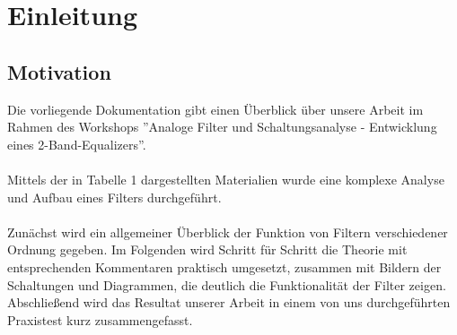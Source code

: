 \clearpage
\section{Einleitung}

\subsection{Motivation}
Die vorliegende Dokumentation gibt einen Überblick über unsere Arbeit im Rahmen des Workshops ”Analoge Filter und Schaltungsanalyse - Entwicklung eines 2-Band-Equalizers”.
\\
\\
Mittels der in Tabelle 1 dargestellten Materialien wurde eine komplexe Analyse und Aufbau eines Filters durchgeführt. 
\\
\\
Zunächst wird ein allgemeiner Überblick der Funktion von Filtern verschiedener Ordnung gegeben. Im Folgenden wird Schritt für Schritt die Theorie mit entsprechenden Kommentaren praktisch umgesetzt, zusammen mit Bildern der Schaltungen und Diagrammen, die
deutlich die Funktionalität der Filter zeigen. Abschließend wird das Resultat unserer Arbeit in einem von uns durchgeführten Praxistest kurz zusammengefasst.

